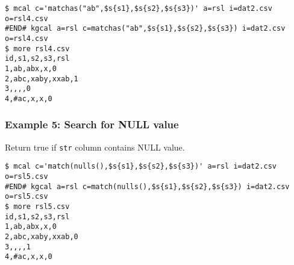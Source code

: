 \begin{Verbatim}[baselinestretch=0.7,frame=single]
$ mcal c='matchas("ab",$s{s1},$s{s2},$s{s3})' a=rsl i=dat2.csv o=rsl4.csv
#END# kgcal a=rsl c=matchas("ab",$s{s1},$s{s2},$s{s3}) i=dat2.csv o=rsl4.csv
$ more rsl4.csv
id,s1,s2,s3,rsl
1,ab,abx,x,0
2,abc,xaby,xxab,1
3,,,,0
4,#ac,x,x,0
\end{Verbatim}
\subsubsection*{Example 5: Search for NULL value}

Return true if \verb|str| column contains NULL value.


\begin{Verbatim}[baselinestretch=0.7,frame=single]
$ mcal c='match(nulls(),$s{s1},$s{s2},$s{s3})' a=rsl i=dat2.csv o=rsl5.csv
#END# kgcal a=rsl c=match(nulls(),$s{s1},$s{s2},$s{s3}) i=dat2.csv o=rsl5.csv
$ more rsl5.csv
id,s1,s2,s3,rsl
1,ab,abx,x,0
2,abc,xaby,xxab,0
3,,,,1
4,#ac,x,x,0
\end{Verbatim}
